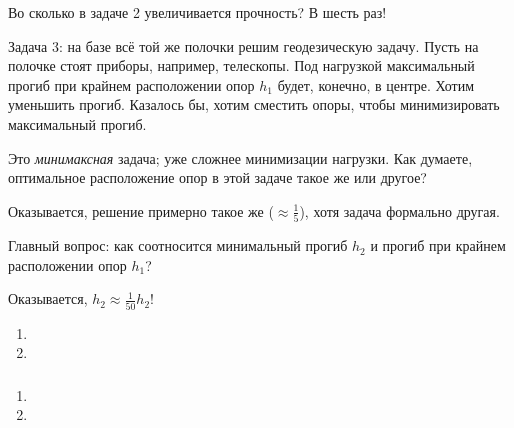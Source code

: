 \documentclass[main.tex]{subfiles}
\begin{document}
Во сколько в задаче 2 увеличивается прочность? В шесть раз!

Задача 3: на базе всё той же полочки решим геодезическую задачу.
Пусть на полочке стоят приборы, например, телескопы.
Под нагрузкой максимальный прогиб при крайнем расположении опор $ h_1 $ будет, конечно, в центре.
Хотим уменьшить прогиб.
Казалось бы, хотим сместить опоры, чтобы минимизировать максимальный прогиб.

Это \emph{минимаксная} задача; уже сложнее минимизации нагрузки.
Как думаете, оптимальное расположение опор в этой задаче такое же или другое?

Оказывается, решение примерно такое же ($ \approx \frac{1}{5} $), хотя задача формально другая.

Главный вопрос: как соотносится минимальный прогиб $h_2$ и прогиб при крайнем расположении опор $ h_1 $?

Оказывается, $ h_2 \approx \frac{1}{50} h_2 $!



\begin{enumerate}[noitemsep]
	\item
	\item
\end{enumerate}

\subsubsection{}

\begin{enumerate}[noitemsep]
	\item
	\item
\end{enumerate}
\end{document}
